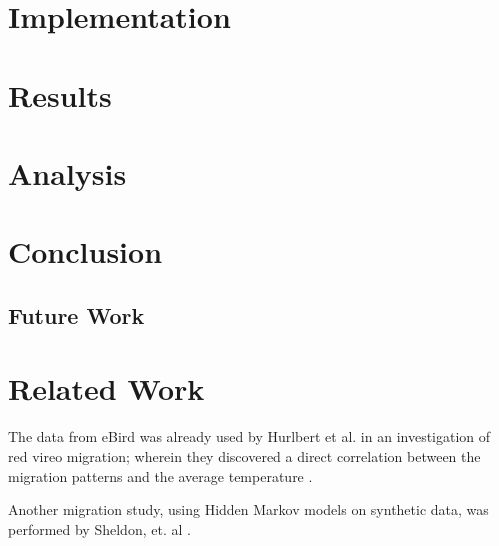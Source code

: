 \documentclass{article} %
\begin{document}
\section{Implementation}

\section{Results}

\section{Analysis}

\section{Conclusion}
\subsection{Future Work}

\section{Related Work}
The data from eBird was already used by Hurlbert et al. in an investigation of red vireo migration; wherein they discovered a direct correlation between the migration patterns and the average temperature \cite{hurlbert}. 

Another migration study, using Hidden Markov models on synthetic data, was performed by Sheldon, et. al \cite{conf/nips/SheldonEK07}. 



\end{document}
